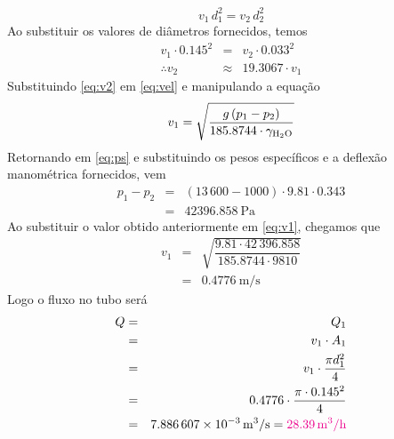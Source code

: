 \documentclass[a4paper, 12pt, brazilian]{article}
\begin{document}
	\begin{equation}
		v_{1}\,d_{1}^{2}=v_{2}\,d_{2}^{2}
	\end{equation}
	Ao substituir os valores de diâmetros fornecidos, temos
	\begin{eqnarray}
		v_{1}\cdot 0.145^{2}&=&v_{2}\cdot 0.033^{2}\\
		\therefore v_{2}&\approx&19.3067\cdot v_{1}\label{eq:v2}
	\end{eqnarray}
	Substituindo \eqref{eq:v2} em \eqref{eq:vel} e manipulando a equação
	\begin{equation}
		\label{eq:v1}
		v_{1}=\sqrt{\dfrac{g\,(p_{1}-p_{2})}{185.8744\cdot\gamma_{\ce{H2O}}}}
	\end{equation}
	Retornando em \eqref{eq:ps} e substituindo os pesos específicos e a deflexão manométrica fornecidos, vem
	\begin{eqnarray}
		p_{1}-p_{2}&=&(13\,600-1000)\cdot 9.81\cdot 0.343\\
				   &=&\SI{42396.858}{\pascal}
	\end{eqnarray}
	Ao substituir o valor obtido anteriormente em \eqref{eq:v1}, chegamos que
	\begin{eqnarray}
		v_{1}&=&\sqrt{\dfrac{9.81\cdot 42\,396.858}{185.8744\cdot 9810}}\\
		 	 &=&\SI{0.4776}{\meter/\second}
	\end{eqnarray}
	Logo o fluxo no tubo será
	\begin{eqnarray}
		Q&=&Q_{1}\\
		 &=&v_{1}\cdot A_{1}\\
		 &=&v_{1}\cdot\dfrac{\pi d_{1}^{2}}{4}\\
		 &=&0.4776\cdot\dfrac{\pi\cdot 0.145^{2}}{4}\\
		 &=&\SI{7.886607e-3}{\meter^{3}/\second}=\textcolor{magenta}{\SI{28.39}{\meter^{3}/\hour}}
	\end{eqnarray}
\end{document}

